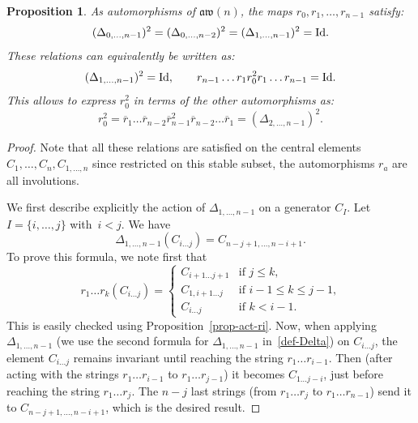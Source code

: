 \documentclass[10pt,a4paper]{amsart}
\numberwithin{equation}{section}
\newtheorem{prop}[theo]{Proposition}
\theoremstyle{definition}
\newcommand{\rb}{\overline{r}}
\newcommand{\aw}{\mathfrak{aw}(n)}
\begin{document}
\begin{prop}\label{prop-Delta}
As automorphisms of $\aw$, the maps $r_0,r_1,\dots,r_{n-1}$ satisfy:
\[(\Delta_{0,\dots,n-1})^2=(\Delta_{0,\dots,n-2})^2=(\Delta_{1,\dots,n-1})^2={\rm Id} .\]
These relations can equivalently be written as:
\begin{gather}
(\Delta_{1,\dots,n-1})^2={\rm Id} , \qquad
r_{n-1}\dots r_1 r_0^2r_1\dots r_{n-1}={\rm Id}.\label{rel-quotient-braid}
\end{gather}
This allows to express $r_0^2$ in terms of the other automorphisms as:
\[
r_0^2=\rb_1\dots \rb_{n-2}\rb_{n-1}^2\rb_{n-2}\dots \rb_1=(\Delta_{2,\dots,n-1})^2 .
\]
\end{prop}
\begin{proof}
Note that all these relations are satisfied on the central elements $C_1,\dots,C_n,C_{1,\dots,n}$ since restricted on this stable subset, the automorphisms $r_a$ are all involutions.

We first describe explicitly the action of $\Delta_{1,\dots,n-1}$ on a generator $C_I$. Let $I=\{i,\dots,j\}$ with~$i< j$. We have
\begin{equation*}%
\Delta_{1,\dots,n-1}(C_{i\dots j})=C_{n-j+1,\dots,n-i+1} .
\end{equation*}
To prove this formula, we note first that
\[r_1\dots r_k (C_{i\dots j})=\begin{cases}
C_{i+1\dots j+1} & \text{if $j\leq k$,}\\
C_{1,i+1\dots j} & \text{if $i-1\leq k\leq j-1$,}\\
C_{i\dots j} & \text{if $k<i-1$.}
\end{cases}
\]
This is easily checked using Proposition~\ref{prop-act-ri}. Now, when applying $\Delta_{1,\dots,n-1}$ (we use the second formula for $\Delta_{1,\dots,n-1}$ in~\eqref{def-Delta}) on $C_{i\dots j}$, the element $C_{i\dots j}$ remains invariant until reaching the string $r_1\dots r_{i-1}$. Then (after acting with the strings $r_1\dots r_{i-1}$ to $r_1\dots r_{j-1}$) it becomes $C_{1\dots j-i}$, just before reaching the string $r_1\dots r_j$. The $n-j$ last strings (from $r_1\dots r_j$ to $r_1\dots r_{n-1}$) send it to $C_{n-j+1,\dots,n-i+1}$, which is the desired result.


\end{proof}
\end{document}
